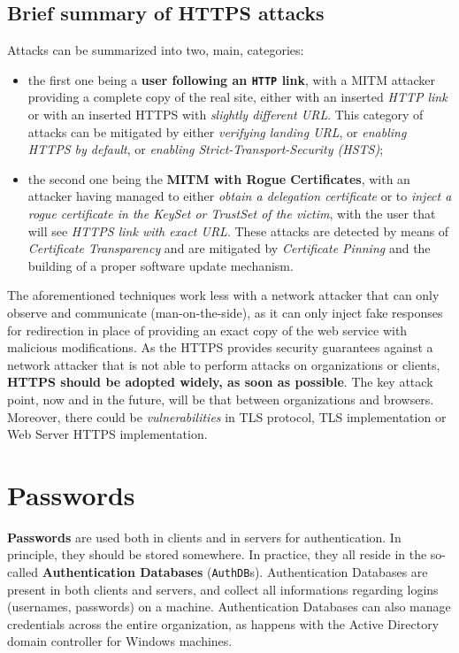 \documentclass[10pt]{extbook}
\begin{document}
\section{Brief summary of HTTPS attacks}

Attacks can be summarized into two, main, categories: 
\begin{itemize}
    \item the first one being a \textbf{user following an \texttt{HTTP} link},
        with a MITM attacker providing a complete copy of the real site, either
        with an inserted \emph{HTTP link} or with an inserted HTTPS with
        \emph{slightly different URL}. This category of attacks can be
        mitigated by either \emph{verifying landing URL}, or \emph{enabling
        HTTPS by default}, or \emph{enabling Strict\--Transport\--Security
        (HSTS)};
    \item the second one being the \textbf{MITM with Rogue Certificates}, with
        an attacker having managed to either \emph{obtain a delegation
        certificate} or to \emph{inject a rogue certificate in the KeySet or
        TrustSet of the victim}, with the user that will see \emph{HTTPS link with
        exact URL}. These attacks are detected by means of \emph{Certificate
        Transparency} and are mitigated by \emph{Certificate Pinning} and the
        building of a proper software update mechanism.
\end{itemize}

The aforementioned techniques work less with a network attacker that can only
observe and communicate (man\--on\--the\--side), as it can only inject fake
responses for redirection in place of providing an exact copy of the web
service with malicious modifications. As the HTTPS provides security guarantees
against a network attacker that is not able to perform attacks on organizations
or clients, \textbf{HTTPS should be adopted widely, as soon as possible}. The
key attack point, now and in the future, will be that between organizations and
browsers. Moreover, there could be \emph{vulnerabilities} in TLS protocol, TLS
implementation or Web Server HTTPS implementation.


\chapter{Passwords}

\textbf{Passwords} are used both in clients and in servers for authentication.
In principle, they should be stored somewhere. In practice, they all reside in
the so\--called \textbf{Authentication Databases} (\texttt{AuthDB}s).
Authentication Databases are present in both clients and servers, and collect
all informations regarding logins (usernames, passwords) on a machine.
Authentication Databases can also manage credentials across the entire
organization, as happens with the Active Directory domain controller for
Windows machines.
\end{document}
